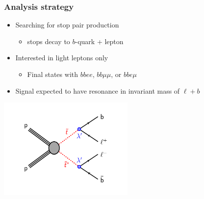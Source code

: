 \documentclass[10pt, svgnames]{beamer}
\begin{document}
\begin{frame}
  \frametitle{Analysis strategy}
  \begin{itemize}
    \item Searching for stop pair production
      \begin{itemize}
        \item stops decay to
          {\color{nice_red} $b$-quark + lepton }
      \end{itemize}
    \item Interested in light leptons only
      \begin{itemize}
        \item Final states with
          {\color{nice_blue} $bbee$},
          {\color{nice_blue} $bb\mu\mu$}, or
          {\color{nice_blue} $bbe\mu$}
      \end{itemize}
    \item Signal expected to have resonance in invariant mass of
      $\ell+b$
  \end{itemize}
  \begin{center}
    \includegraphics[width=0.5\textwidth]{figures/b_minus_l_stop_stop.pdf}
  \end{center}
\end{frame}
\end{document}
